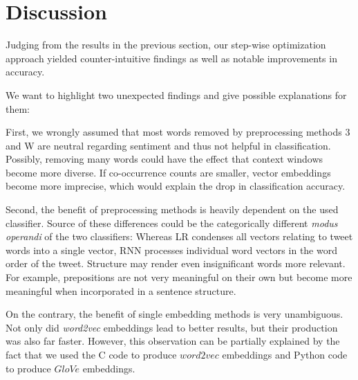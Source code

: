 \section{Discussion}

Judging from the results in the previous section, our step-wise optimization approach yielded counter-intuitive findings as well as notable improvements in accuracy.

We want to highlight two unexpected findings and give possible explanations for them:

First, we wrongly assumed that most words removed by preprocessing methods 3 and W are neutral regarding sentiment and thus not helpful in classification. Possibly, removing many words could have the effect that context windows become more diverse. If co-occurrence counts are smaller, vector embeddings  become more imprecise, which would explain the drop in classification accuracy.  

Second, the benefit of preprocessing methods is heavily dependent on the used classifier. Source of these differences could be the categorically different \textit{modus operandi} of the two classifiers: Whereas LR condenses all vectors relating to tweet words into a single vector, RNN processes individual word vectors in the word order of the tweet. Structure may render even insignificant words more relevant. For example, prepositions are not very meaningful on their own but become more meaningful when incorporated in a sentence structure.

On the contrary, the benefit of single embedding methods is very unambiguous. Not only did \textit{word2vec} embeddings lead to better results, but their production was also far faster. However, this observation can be partially explained by the fact that we used the C code to produce $word2vec$ embeddings and Python code to produce $GloVe$ embeddings.

